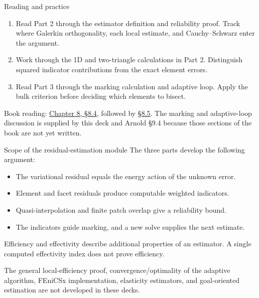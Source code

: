 \documentclass[11pt,aspectratio=169]{beamer}
\begin{document}
\begin{frame}{Reading and practice}
\begin{enumerate}
 \item Read Part 2 through the estimator definition and reliability proof.
 Track where Galerkin orthogonality, each local estimate, and
 Cauchy--Schwarz enter the argument.
 \item Work through the 1D and two-triangle calculations in Part 2.
 Distinguish squared indicator contributions from the exact element errors.
 \item Read Part 3 through the marking calculation and adaptive loop.
 Apply the bulk criterion before deciding which elements to bisect.
\end{enumerate}
Book reading:
\href{https://ceadpx.github.io/finite-element-methods/chapters/08-aposteriori-adaptivity.html\#sec-c8-estimator}{Chapter 8, \S8.4},
followed by
\href{https://ceadpx.github.io/finite-element-methods/chapters/08-aposteriori-adaptivity.html\#sec-c8-reliability-efficiency}{\S8.5}.
The marking and adaptive-loop discussion is supplied by this deck and Arnold
\S9.4 because those sections of the book are not yet written.
\end{frame}

\begin{frame}{Scope of the residual-estimation module}
The three parts develop the following argument:
\begin{itemize}
 \item The variational residual equals the energy action of the unknown error.
 \item Element and facet residuals produce computable weighted indicators.
 \item Quasi-interpolation and finite patch overlap give a reliability bound.
 \item The indicators guide marking, and a new solve supplies the next estimate.
\end{itemize}
Efficiency and effectivity describe additional properties of an estimator.
A single computed effectivity index does not prove efficiency.

The general local-efficiency proof, convergence/optimality of the adaptive
algorithm, FEniCSx implementation, elasticity estimators, and goal-oriented
estimation are not developed in these decks.
\end{frame}
\end{document}
